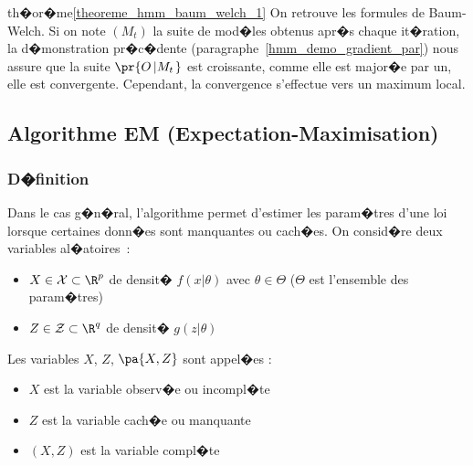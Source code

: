 \begin{xdemo}{th�or�me}{\ref{theoreme_hmm_baum_welch_1}}
On retrouve les formules de Baum-Welch. Si on note $\left(  M_{t}\right)  $ la suite de mod�les obtenus apr�s chaque it�ration, la d�monstration pr�c�dente (paragraphe~\ref{hmm_demo_gradient_par}) nous assure que la suite $\pr{  O\left| M_{t}\right.  }  $ est croissante, comme elle est major�e par un, elle est convergente. Cependant, la convergence s'effectue vers un maximum local.

\end{xdemo}





















\subsection{Algorithme EM (Expectation-Maximisation)}
\label{hmm_algo_em_sec_new}


\subsubsection{D�finition}

Dans le cas g�n�ral, l'algorithme permet d'estimer les param�tres d'une loi lorsque certaines donn�es sont manquantes ou cach�es. On consid�re deux variables al�atoires~:

\begin{itemize}
\item $X\in\mathcal{X}\subset \R^p$ de densit� $f\left(  x\left|  \theta\right.  \right)  $ avec $\theta\in\Theta$ ($\Theta$ est l'ensemble des param�tres) 
\item $Z\in\mathcal{Z}\subset\R^{q}$ de densit� $g\left(  z\left|  \theta\right.  \right)  $
\end{itemize}


Les variables $X$, $Z$, $\pa{X,Z}$ sont appel�es :


\begin{itemize}
\item $X$ est la variable observ�e ou incompl�te
\item $Z$ est la variable cach�e ou manquante
\item $\left( X,Z\right) $ est la variable compl�te
\end{itemize}


